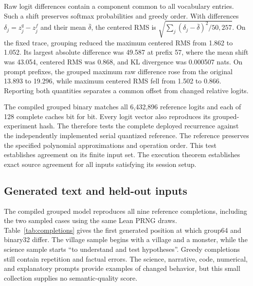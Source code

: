 Raw logit differences contain a component common to all vocabulary entries.  Such a shift preserves softmax probabilities and greedy order.  With differences $\delta_j=z^q_j-z^f_j$ and their mean $\bar\delta$, the centered RMS is $\sqrt{\sum_j(\delta_j-\bar\delta)^2/50{,}257}$.  On the fixed trace, grouping reduced the maximum centered RMS from 1.862 to 1.052.  Its largest absolute difference was 49.587 at prefix 57, where the mean shift was 43.054, centered RMS was 0.868, and KL divergence was 0.000507 nats.  On prompt prefixes, the grouped maximum raw difference rose from the original 13.893 to 19.296, while maximum centered RMS fell from 1.502 to 0.866.  Reporting both quantities separates a common offset from changed relative logits.

The compiled grouped binary matches all 6,432,896 reference logits and each of 128 complete caches bit for bit.  Every logit vector also reproduces its grouped-experiment hash.  The  therefore tests the complete deployed recurrence against the independently implemented serial quantized reference.  The reference preserves the specified polynomial approximations and operation order.  This test establishes agreement on its finite input set.  The execution theorem establishes exact source agreement for all inputs satisfying its session setup.

\subsection{Generated text and held-out inputs}

The compiled grouped model reproduces all nine reference completions, including the two sampled cases using the same Lean PRNG draws.  Table~\ref{tab:completions} gives the first generated position at which group64 and binary32 differ.  The village sample begins with a village and a monster, while the science sample starts ``to understand and test hypotheses''.  Greedy completions still contain repetition and factual errors.  The science, narrative, code, numerical, and explanatory prompts provide examples of changed behavior, but this small collection supplies no semantic-quality score.

